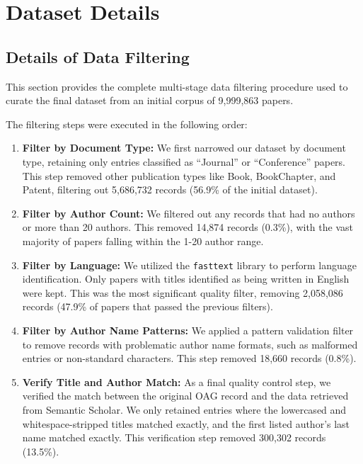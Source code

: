 \documentclass[11pt]{article}
\begin{document}
\section{Dataset Details}

\label{sec:appendix_dataset}

\subsection{Details of Data Filtering}
\label{sec:appendix_filtering}

This section provides the complete multi-stage data filtering procedure used to curate the final dataset from an initial corpus of 9,999,863 papers.

The filtering steps were executed in the following order:
\begin{enumerate}[
   leftmargin=1em,
    itemsep=0.2em,
    topsep=0.2em,
    partopsep=0em,
    parsep=0em
]
    \item \textbf{Filter by Document Type:} We first narrowed our dataset by document type, retaining only entries classified as ``Journal'' or ``Conference'' papers. This step removed other publication types like Book, BookChapter, and Patent, filtering out 5,686,732 records (56.9\% of the initial dataset).

    \item \textbf{Filter by Author Count:} We filtered out any records that had no authors or more than 20 authors. This removed 14,874 records (0.3\%), with the vast majority of papers falling within the 1-20 author range.

    \item \textbf{Filter by Language:} We utilized the \texttt{fasttext} library to perform language identification. Only papers with titles identified as being written in English were kept. This was the most significant quality filter, removing 2,058,086 records (47.9\% of papers that passed the previous filters).

    \item \textbf{Filter by Author Name Patterns:} We applied a pattern validation filter to remove records with problematic author name formats, such as malformed entries or non-standard characters. This step removed 18,660 records (0.8\%).

    \item \textbf{Verify Title and Author Match:} As a final quality control step, we verified the match between the original OAG record and the data retrieved from Semantic Scholar. We only retained entries where the lowercased and whitespace-stripped titles matched exactly, and the first listed author's last name matched exactly. This verification step removed 300,302 records (13.5\%).
\end{enumerate}
\end{document}
